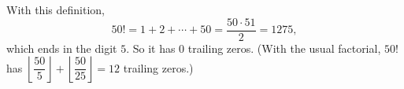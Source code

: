 With this definition,
\[50!=1+2+\cdots+50=\dfrac{50\cdot51}{2}=1275,\]
which ends in the digit $5$. So it has $\boxed{0}$ trailing zeros. (With the usual factorial, $50!$ has $\left\lfloor\dfrac{50}{5}\right\rfloor+\left\lfloor\dfrac{50}{25}\right\rfloor=12$ trailing zeros.)
